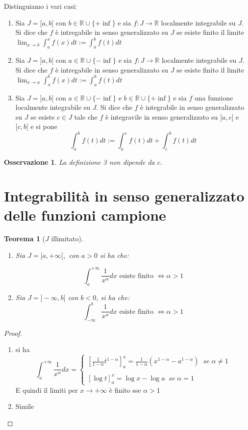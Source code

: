 \documentclass[a4paper; 11pt oneside]{book}
\theoremstyle{break}
\newtheorem{teo}{Teorema}[chapter]
\theoremstyle{peresempio}
\newtheorem{oss}[cor]{Osservazione}
\begin{document}
Distinguiamo i vari casi:
    \begin{enumerate}
      \item Sia $J=[a,b[$ con $b\in \mathbb{R}\cup\{+\inf\}$ e sia $f:J\to\mathbb{R}$ localmente integrabile su $J$. Si dice che $f$ è intregabile in senso generalizzato su $J$ se esiste finito il limite $\displaystyle \lim_{x\to b}\int_a^x f(x)dt:=\int_a^b f(t)dt$

      \item Sia $J=]a,b[$ con $a\in \mathbb{R}\cup\{-\inf\}$ e sia $f:J\to\mathbb{R}$ localmente integrabile su $J$. Si dice che $f$ è intregabile in senso generalizzato su $J$ se esiste finito il limite $\displaystyle \lim_{x\to a}\int_x^b f(x)dt:=\int_a^b f(t)dt$ 
      
      \item Sia $J=]a,b[$ con $a\in \mathbb{R}\cup\{-\inf\}$ e $b\in \mathbb{R}\cup\{+\inf\}$ e sia $f$ una funzione localmente integrabile su $J$. Si dice che $f$ è integrabile in senso generalizzato su $J$ se esiste $c\in J$ tale che $f$ è integravile in senso generalizzato su $]a,c]$ e $[c,b[$ e si pone
      $$\int_a^b f(t)dt:=\int_a^c f(t)dt + \int_c^b f(t)dt$$
    \end{enumerate}
  \begin{oss}
  La definizione 3 non dipende da $c$.
  \end{oss}
  \section{Integrabilità in senso generalizzato delle funzioni campione} %
  \begin{teo}[$J$ illimitato]
  \begin{enumerate}
    \item Sia $J=[a,+\infty[,$ con $ a>0$ si ha che:
    
    $$ 
    \int_a^{+ \infty}\frac{1}{x^{\alpha}}dx \text{ esiste finito }\Leftrightarrow\alpha>1 
$$
    \item Sia $J=]- \infty, b]$ con $b<0$, si ha che:
    $$
    	\int_{- \infty}^b\frac{1}{x^{\alpha}}dx \text{ esiste finito }\Leftrightarrow\alpha>1 
    $$
  \end{enumerate}
  
  \end{teo}
  
  \begin{proof}
  \begin{enumerate}
  \item si ha
  $$\int_a^{+ \infty}\frac{1}{x^{\alpha}}dx=\begin{cases}
  \left[\frac{1}{1-\alpha}t^{1-\alpha}\right]^x_a=\frac{1}{1-\alpha}\left(x^{1-\alpha}-a^{1-\alpha}\right)\;\;se\;\alpha\neq 1 \\ \\
  \left[\log t\right]^x_a=\log x-\log a\;\; se\; \alpha=1
  \end{cases}
  $$
  E quindi il limiti per $x\to + \infty$ è finito sse $\alpha>1$
  \item Simile
  \end{enumerate}
  \end{proof}
\end{document}
